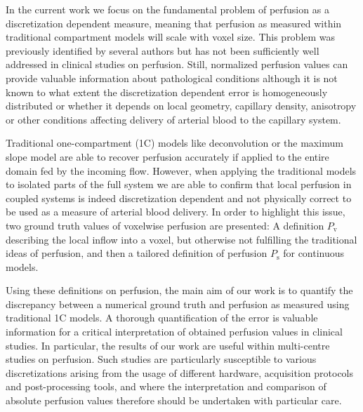 \documentclass[aps,prb,article,groupedaddress,showkeys]{revtex4}
\begin{document}
In the current work we focus on the fundamental problem of perfusion as a discretization dependent measure, meaning that perfusion as measured within traditional compartment models will scale with voxel size. This problem was previously identified by several authors \cite{Henkelman1990,Guibert2013,sourbron14} but has not been sufficiently well addressed in clinical studies on perfusion. Still, normalized perfusion values can provide valuable information about pathological conditions although it is not known to what extent the discretization dependent error is homogeneously distributed or whether it depends on local geometry, capillary density, anisotropy or other conditions affecting delivery of arterial blood to the capillary system. %

Traditional one-compartment (1C) models like deconvolution or the maximum slope model are able to recover perfusion accurately if applied to the entire domain fed by the incoming flow. However, when applying the traditional models to isolated parts of the full system we are able to confirm that local perfusion in coupled systems is indeed discretization dependent and not physically correct to be used as a measure of arterial blood delivery. In order to highlight this issue, two ground truth values of voxelwise perfusion are presented: A definition $P_{\mathrm{v}}$ describing the local inflow into a voxel, but otherwise not fulfilling the traditional ideas of perfusion, and then a tailored definition of perfusion $P_{\mathrm{s}}$ for continuous models. 
	
Using these definitions on perfusion, the main aim of our work is to quantify the discrepancy between a numerical ground truth and perfusion as measured using traditional 1C models. A thorough quantification of the error is valuable information for a critical interpretation of obtained perfusion values in clinical studies. In particular, the results of our work are useful within multi-centre studies on perfusion. Such studies are particularly susceptible to various discretizations arising from the usage of different hardware, acquisition protocols and post-processing tools, and where the interpretation and comparison of absolute perfusion values therefore should be undertaken with particular care.
	
		
\end{document}

